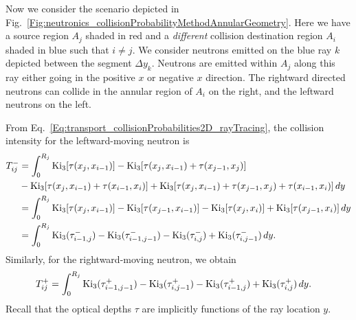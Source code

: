 Now we consider the scenario depicted in Fig.~\ref{Fig:neutronics_collisionProbabilityMethodAnnularGeometry}. Here we have a source region $A_j$ shaded in red and a \emph{different} collision destination region $A_i$ shaded in blue such that $i \ne j$. We consider neutrons emitted on the blue ray $k$ depicted between the segment $\Delta y_k$. Neutrons are emitted within $A_j$ along this ray either going in the positive $x$ or negative $x$ direction. The rightward directed neutrons can collide in the annular region of $A_i$ on the right, and the leftward neutrons on the left.

From Eq.~\eqref{Eq:transport_collisionProbabilities2D_rayTracing}, the collision intensity for the leftward-moving neutron is
\begin{align}
  T_{ij}^- 
  &= \int_0^{R_j} \textrm{Ki}_3[ \tau(x_j,x_{i-1}) ] - \textrm{Ki}_3[ \tau(x_j,x_{i-1}) + \tau(x_{j-1},x_j) ]  \nonumber \\*
  &- \textrm{Ki}_3[ \tau(x_j,x_{i-1}) + \tau(x_{i-1},x_i) ] + \textrm{Ki}_3[ \tau(x_j,x_{i-1}) + \tau(x_{j-1},x_j) + \tau(x_{i-1},x_i)  ] \, dy \nonumber \\
  &= \int_0^{R_j} \textrm{Ki}_3[ \tau(x_j,x_{i-1}) ] - \textrm{Ki}_3[ \tau(x_{j-1},x_{i-1})  ] - \textrm{Ki}_3[ \tau(x_j,x_i)  ] + \textrm{Ki}_3[ \tau(x_{j-1},x_i) ] \, dy \nonumber \\
  &= \int_0^{R_j} \textrm{Ki}_3( \tau_{i-1,j}^- ) - \textrm{Ki}_3( \tau_{i-1,j-1}^-  ) - \textrm{Ki}_3( \tau_{i,j}^- ) + \textrm{Ki}_3( \tau_{i,j-1}^- ) \, dy.
\end{align}
Similarly, for the rightward-moving neutron, we obtain
\begin{align}
  T_{ij}^+ &= \int_0^{R_j} \textrm{Ki}_3( \tau_{i-1,j-1}^+ ) - \textrm{Ki}_3(\tau_{i,j-1}^+) - \textrm{Ki}_3(\tau_{i-1,j}^+) + \textrm{Ki}_3(\tau_{i,j}^+) \, dy.
\end{align}
Recall that the optical depths $\tau$ are implicitly functions of the ray location $y$.

